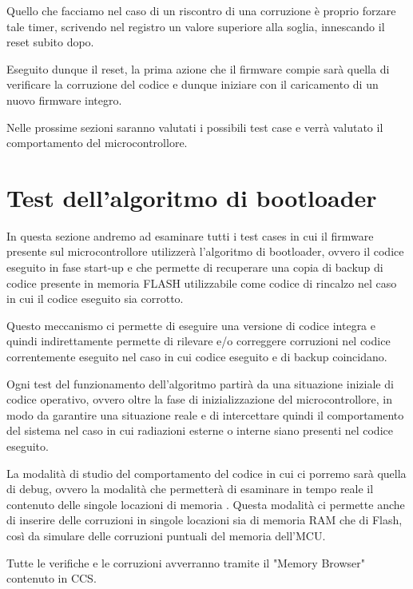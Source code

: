 \documentclass[LaM,binding=0.6cm]{../sapthesis}
\begin{document}
Quello che facciamo nel caso di un riscontro di una corruzione è proprio forzare tale timer, scrivendo nel registro un valore superiore alla soglia, innescando il reset subito dopo.

Eseguito dunque il reset, la prima azione che il firmware compie sarà quella di verificare la corruzione del codice e dunque iniziare con il caricamento di un nuovo firmware integro.

Nelle prossime sezioni saranno valutati i possibili test case e verrà valutato il comportamento del microcontrollore.

\newpage
\section{Test dell'algoritmo di bootloader}
In questa sezione andremo ad esaminare tutti i test cases in cui il firmware presente sul microcontrollore utilizzerà l'algoritmo di bootloader, ovvero il codice eseguito in fase start-up e che permette di recuperare una copia di backup di codice presente in memoria FLASH utilizzabile come codice di rincalzo nel caso in cui il codice eseguito sia corrotto.

Questo meccanismo ci permette di eseguire una versione di codice integra e quindi indirettamente permette di rilevare e/o correggere corruzioni nel codice correntemente eseguito nel caso in cui codice eseguito e di backup coincidano.

Ogni test del funzionamento dell'algoritmo partirà da una situazione iniziale di codice operativo, ovvero oltre la fase di inizializzazione del microcontrollore, in modo da garantire una situazione reale e di intercettare quindi il comportamento del sistema nel caso in cui radiazioni esterne o interne siano presenti nel codice eseguito.

La modalità di studio del comportamento del codice in cui ci porremo sarà quella di debug, ovvero la modalità che permetterà di esaminare in tempo reale il contenuto delle singole locazioni di memoria .
Questa modalità ci permette anche di inserire delle corruzioni in singole locazioni sia di memoria RAM che di Flash, così da simulare delle corruzioni puntuali del memoria dell'MCU.

Tutte le verifiche e le corruzioni avverranno tramite il "Memory Browser" contenuto in CCS.
\end{document}
